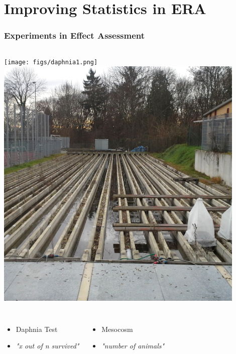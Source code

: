 \documentclass[
	10pt
	]{beamer}
\begin{document}
\section{Improving Statistics in ERA}

{%
\begin{frame}
\frametitle{Experiments in Effect Assessment}
	\begin{columns}[T]
		\texttt{[image: figs/daphnia1.png]}
	\column<2->{.49\textwidth}
		\includegraphics[width=0.9\textwidth]{figs/mesocosm_ld.jpg}
	\end{columns}

	\vfill
	\begin{columns}[T]
		\begin{itemize}
			\item Daphnia Test
			\item \emph{"x out of n survived"}
		\end{itemize}

		\begin{itemize}
			\item Mesocosm
			\item \emph{"number of animals"}
		\end{itemize}
	\end{columns}
\end{frame}
}%
\end{document}

